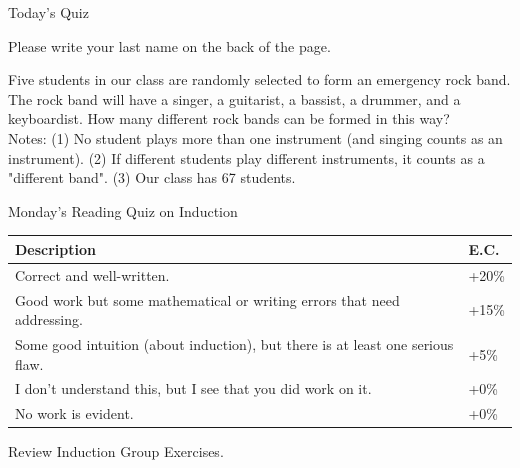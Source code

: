 \documentclass[10pt]{beamer}
\begin{document}
\begin{frame}{Today's Quiz}

\begin{myyellowbox}[title=Logistics Alert]
Please write your last name on the back of the page. 
\end{myyellowbox}

\vfill


 \begin{mygreenbox}[title=Reading Quiz (Lists)]
Five students in our class are randomly selected to form an emergency rock band.  The rock band will have a singer, a guitarist, a bassist, a drummer, and a keyboardist.  How many different rock bands can be formed in this way?  \\

Notes: (1) No student plays more than one instrument (and singing counts as an instrument). (2) If different students play different instruments, it counts as a "different band". (3) Our class has 67 students.
\end{mygreenbox}
\end{frame}



\begin{frame}{Monday's Reading Quiz on Induction}

\begin{myredbox}[title=Scoring rubric]
\begin{tabularx}{\textwidth}{|X|L{1cm}|}
\hline 
\textbf{Description} & \textbf{E.C.} \\
\hline 
Correct and well-written. & +20\% \\
 Good work but some mathematical or writing errors that need addressing. & +15\%\\
Some good intuition (about induction), but there is at least one serious flaw. & +5\%  \\
I don't understand this, but I see that you did work on it. & +0\%  \\
No work is evident.	&+0\% \\
\hline
\end{tabularx}
\end{myredbox}
\end{frame}


\begin{frame}[standout]
Review Induction Group Exercises.
	
\end{frame}
\end{document}
